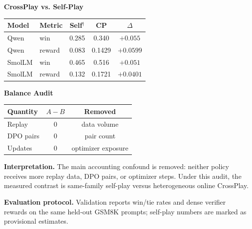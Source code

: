 \documentclass[final]{article}
\newcommand{\crossAWin}{0.340}
\newcommand{\crossBWin}{0.516}
\newcommand{\crossAReward}{0.1429}
\newcommand{\crossBReward}{0.1721}
\newcommand{\selfQwenReward}{0.083}
\newcommand{\selfSmolReward}{0.132}
\newcommand{\selfQwenWin}{0.285}
\newcommand{\selfSmolWin}{0.465}
\newcommand{\MiniTitle}[1]{%
  {\color{dmblue}\fontsize{25}{29}\selectfont\bfseries #1}\par
  \vspace{0.15em}
}
\newcommand{\Key}[1]{{\bfseries #1}}
\newcommand{\ResultPlotHeight}{130mm}
\newcommand{\ResultPlotWidth}{0.86\linewidth}
\newcommand{\ResultTable}[1]{%
  \begin{center}
  {\color{black}\fontsize{22.5}{26}\selectfont
   \setlength{\tabcolsep}{2.4pt}
   \renewcommand{\arraystretch}{1.24}#1}
  \end{center}
}
\begin{document}
\begin{minipage}[t]{0.318\linewidth}
\MiniTitle{CrossPlay vs. Self-Play}
\begin{center}
\end{center}
\ResultTable{
\begin{tabular}{@{}llccc@{}}
\toprule
Model & Metric & Self$^\dagger$ & CP & $\Delta$ \\
\midrule
Qwen & win & \selfQwenWin & \crossAWin & $+0.055$ \\
Qwen & reward & \selfQwenReward & \crossAReward & $+0.0599$ \\
SmolLM & win & \selfSmolWin & \crossBWin & $+0.051$ \\
SmolLM & reward & \selfSmolReward & \crossBReward & $+0.0401$ \\
\bottomrule
\end{tabular}
}
\end{minipage}
\hfill
\begin{minipage}[t]{0.318\linewidth}
\MiniTitle{Balance Audit}
\ResultTable{
\begin{tabular}{@{}lcc@{}}
\toprule
Quantity & $A-B$ & Removed \\
\midrule
Replay & 0 & data volume \\
DPO pairs & 0 & pair count \\
Updates & 0 & optimizer exposure \\
\bottomrule
\end{tabular}
}
{\fontsize{20.5}{25}\selectfont
\Key{Interpretation.} The main accounting confound is removed: neither policy receives more replay data, DPO pairs, or optimizer steps. Under this audit, the measured contrast is same-family self-play versus heterogeneous online CrossPlay.}

\vspace{0.30em}

{\fontsize{20.5}{25}\selectfont
\Key{Evaluation protocol.} Validation reports win/tie rates and dense verifier rewards on the same held-out GSM8K prompts; self-play numbers are marked as provisional estimates.}
\end{minipage}
\end{document}
